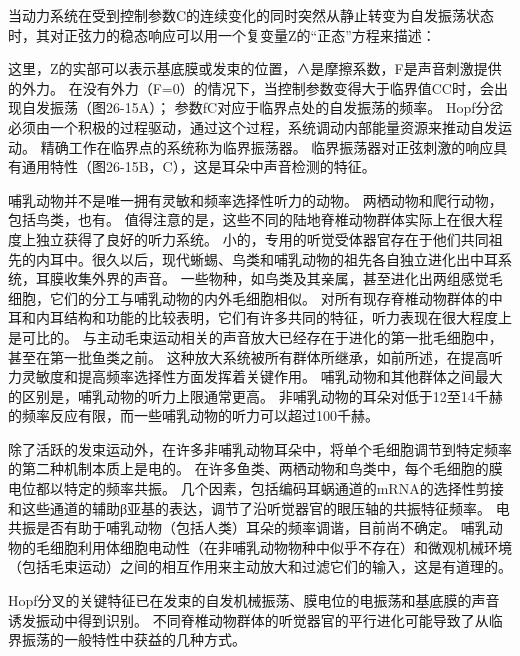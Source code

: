 \begin{proposition}[Hopf分支附近的一般性质] \label{box:26_1}
	
	\quad \quad 当动力系统在受到控制参数C的连续变化的同时突然从静止转变为自发振荡状态时，其对正弦力的稳态响应可以用一个复变量Z的“正态”方程来描述：
	
	\quad \quad 这里，Z的实部可以表示基底膜或发束的位置，∧是摩擦系数，F是声音刺激提供的外力。
	在没有外力（F=0）的情况下，当控制参数变得大于临界值CC时，会出现自发振荡（图26-15A）；
	参数fC对应于临界点处的自发振荡的频率。
	Hopf分岔必须由一个积极的过程驱动，通过这个过程，系统调动内部能量资源来推动自发运动。
	精确工作在临界点的系统称为临界振荡器。
	临界振荡器对正弦刺激的响应具有通用特性（图26-15B，C），这是耳朵中声音检测的特征。
	
	\quad \quad 哺乳动物并不是唯一拥有灵敏和频率选择性听力的动物。
	两栖动物和爬行动物，包括鸟类，也有。
	值得注意的是，这些不同的陆地脊椎动物群体实际上在很大程度上独立获得了良好的听力系统。
	小的，专用的听觉受体器官存在于他们共同祖先的内耳中。很久以后，现代蜥蜴、鸟类和哺乳动物的祖先各自独立进化出中耳系统，耳膜收集外界的声音。
	一些物种，如鸟类及其亲属，甚至进化出两组感觉毛细胞，它们的分工与哺乳动物的内外毛细胞相似。
	对所有现存脊椎动物群体的中耳和内耳结构和功能的比较表明，它们有许多共同的特征，听力表现在很大程度上是可比的。
	与主动毛束运动相关的声音放大已经存在于进化的第一批毛细胞中，甚至在第一批鱼类之前。
	这种放大系统被所有群体所继承，如前所述，在提高听力灵敏度和提高频率选择性方面发挥着关键作用。
	哺乳动物和其他群体之间最大的区别是，哺乳动物的听力上限通常更高。
	非哺乳动物的耳朵对低于12至14千赫的频率反应有限，而一些哺乳动物的听力可以超过100千赫。
	
	\quad \quad 除了活跃的发束运动外，在许多非哺乳动物耳朵中，将单个毛细胞调节到特定频率的第二种机制本质上是电的。
	在许多鱼类、两栖动物和鸟类中，每个毛细胞的膜电位都以特定的频率共振。
	几个因素，包括编码耳蜗通道的mRNA的选择性剪接和这些通道的辅助β亚基的表达，调节了沿听觉器官的眼压轴的共振特征频率。
	电共振是否有助于哺乳动物（包括人类）耳朵的频率调谐，目前尚不确定。
	哺乳动物的毛细胞利用体细胞电动性（在非哺乳动物物种中似乎不存在）和微观机械环境（包括毛束运动）之间的相互作用来主动放大和过滤它们的输入，这是有道理的。
	
	\quad \quad Hopf分叉的关键特征已在发束的自发机械振荡、膜电位的电振荡和基底膜的声音诱发振动中得到识别。
	不同脊椎动物群体的听觉器官的平行进化可能导致了从临界振荡的一般特性中获益的几种方式。
	
\end{proposition}


